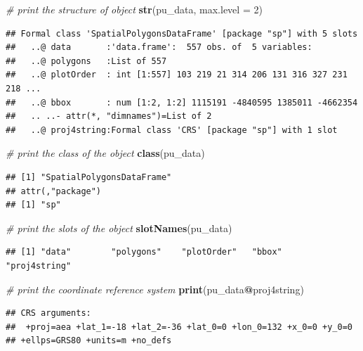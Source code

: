 \documentclass[12pt,]{book}
\newenvironment{Shaded}{\begin{snugshade}}{\end{snugshade}}
\newcommand{\KeywordTok}[1]{\textcolor[rgb]{0.13,0.29,0.53}{\textbf{#1}}}
\newcommand{\DataTypeTok}[1]{\textcolor[rgb]{0.13,0.29,0.53}{#1}}
\newcommand{\DecValTok}[1]{\textcolor[rgb]{0.00,0.00,0.81}{#1}}
\newcommand{\CommentTok}[1]{\textcolor[rgb]{0.56,0.35,0.01}{\textit{#1}}}
\newcommand{\OperatorTok}[1]{\textcolor[rgb]{0.81,0.36,0.00}{\textbf{#1}}}
\newcommand{\NormalTok}[1]{#1}
\begin{document}
\begin{Shaded}
\begin{Highlighting}[]
\CommentTok{# print the structure of object}
\KeywordTok{str}\NormalTok{(pu_data, }\DataTypeTok{max.level =} \DecValTok{2}\NormalTok{)}
\end{Highlighting}
\end{Shaded}

\begin{verbatim}
## Formal class 'SpatialPolygonsDataFrame' [package "sp"] with 5 slots
##   ..@ data       :'data.frame':  557 obs. of  5 variables:
##   ..@ polygons   :List of 557
##   ..@ plotOrder  : int [1:557] 103 219 21 314 206 131 316 327 231 218 ...
##   ..@ bbox       : num [1:2, 1:2] 1115191 -4840595 1385011 -4662354
##   .. ..- attr(*, "dimnames")=List of 2
##   ..@ proj4string:Formal class 'CRS' [package "sp"] with 1 slot
\end{verbatim}

\begin{Shaded}
\begin{Highlighting}[]
\CommentTok{# print the class of the object}
\KeywordTok{class}\NormalTok{(pu_data)}
\end{Highlighting}
\end{Shaded}

\begin{verbatim}
## [1] "SpatialPolygonsDataFrame"
## attr(,"package")
## [1] "sp"
\end{verbatim}

\begin{Shaded}
\begin{Highlighting}[]
\CommentTok{# print the slots of the object}
\KeywordTok{slotNames}\NormalTok{(pu_data)}
\end{Highlighting}
\end{Shaded}

\begin{verbatim}
## [1] "data"        "polygons"    "plotOrder"   "bbox"        "proj4string"
\end{verbatim}

\begin{Shaded}
\begin{Highlighting}[]
\CommentTok{# print the coordinate reference system}
\KeywordTok{print}\NormalTok{(pu_data}\OperatorTok{@}\NormalTok{proj4string)}
\end{Highlighting}
\end{Shaded}

\begin{verbatim}
## CRS arguments:
##  +proj=aea +lat_1=-18 +lat_2=-36 +lat_0=0 +lon_0=132 +x_0=0 +y_0=0
## +ellps=GRS80 +units=m +no_defs
\end{verbatim}
\end{document}
